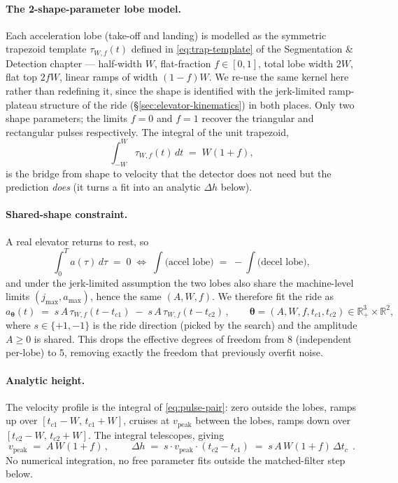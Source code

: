 \paragraph{The 2-shape-parameter lobe model.} Each acceleration lobe
(take-off and landing) is modelled as the symmetric trapezoid
template $\tau_{W,f}(t)$ defined in \eqref{eq:trap-template} of the
Segmentation \& Detection chapter — half-width $W$, flat-fraction
$f\in[0,1]$, total lobe width $2W$, flat top $2fW$, linear ramps of
width $(1-f)W$. We re-use the same kernel here rather than
redefining it, since the shape is identified with the
jerk-limited ramp-plateau structure of the ride
(\S\ref{sec:elevator-kinematics}) in both places. Only two shape
parameters; the limits $f{=}0$ and $f{=}1$ recover the triangular and
rectangular pulses respectively. The integral of the unit trapezoid,
\begin{equation}
  \int_{-W}^{W}\tau_{W,f}(t)\,dt \;=\; W(1+f),
  \label{eq:trapezoid-area}
\end{equation}
is the bridge from shape to velocity that the detector does not need
but the prediction \emph{does} (it turns a fit into an analytic
$\Delta h$ below).

\paragraph{Shared-shape constraint.} A real elevator returns to rest,
so
\[
  \int_{0}^{T}\!a(\tau)\,d\tau \;=\; 0 \;\Longleftrightarrow\;
  \int\!\!\bigl(\text{accel lobe}\bigr)
  \;=\;
  -\int\!\!\bigl(\text{decel lobe}\bigr),
\]
and under the jerk-limited assumption the two lobes also share the
machine-level limits $(j_{\max},a_{\max})$, hence the same
$(A,W,f)$. We therefore fit the ride as
\begin{equation}
  a_{\boldsymbol{\theta}}(t) \;=\;
  s\,A\,\tau_{W,f}(t-t_{c1})
  \;-\;
  s\,A\,\tau_{W,f}(t-t_{c2})\,,
  \qquad
  \boldsymbol{\theta}=(A,W,f,t_{c1},t_{c2})\in\mathbb{R}_+^{3}\times\mathbb{R}^2,
  \label{eq:pulse-pair}
\end{equation}
where $s\in\{+1,-1\}$ is the ride direction (picked by the search)
and the amplitude $A\ge0$ is shared. This drops the effective degrees
of freedom from $8$ (independent per-lobe) to $5$, removing exactly
the freedom that previously overfit noise.

\paragraph{Analytic height.} The velocity profile is the integral of
\eqref{eq:pulse-pair}: zero outside the lobes, ramps up over
$[t_{c1}-W,\,t_{c1}+W]$, cruises at $v_\mathrm{peak}$ between the
lobes, ramps down over $[t_{c2}-W,\,t_{c2}+W]$. The integral
telescopes, giving
\begin{equation}
  v_\mathrm{peak} \;=\; A\,W(1+f)\,,
  \qquad
  \boxed{\;\Delta h \;=\; s \cdot v_\mathrm{peak}\cdot(t_{c2}-t_{c1})
  \;=\; s\,A\,W(1+f)\,\Delta t_c\;}\,.
  \label{eq:dh-analytic}
\end{equation}
No numerical integration, no free parameter fits outside the
matched-filter step below.


